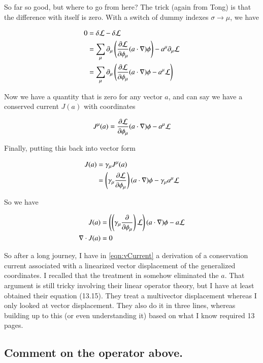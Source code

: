 \documentclass{article}
\begin{document}
So far so good, but where to go from here?  The trick (again from Tong) is that
the difference with itself is zero.  With a switch of dummy indexes $\sigma \rightarrow \mu$, we have

\begin{align*}
0 &=
\delta \mathcal{L} - \delta \mathcal{L}  \\
&= 
\sum_\mu
\partial_\mu
\left(
\frac{\partial {\mathcal{L}}}{\partial {\phi_\mu}}
(a \cdot \nabla) \phi 
\right) -
 a^\mu \partial_\mu \mathcal{L} 
\\
&= 
\sum_\mu
\partial_\mu
\left(
\frac{\partial {\mathcal{L}}}{\partial {\phi_\mu}}
(a \cdot \nabla) \phi 
- a^\mu \mathcal{L} 
\right)
\\
\end{align*}

Now we have a quantity that is zero for any vector $a$, and can say we have
a conserved current $J(a)$ with coordinates

\begin{align}
J^\mu(a)
=
\frac{\partial {\mathcal{L}}}{\partial {\phi_\mu}}
(a \cdot \nabla) \phi 
- a^\mu \mathcal{L} 
\end{align}

Finally, putting this back into vector form

\begin{align*}
J(a) &= \gamma_\mu J^\mu(a) \\
&=
\left( \gamma_\mu \frac{\partial {\mathcal{L}}}{\partial {\phi_\mu}} \right)
(a \cdot \nabla) \phi 
- \gamma_\mu a^\mu \mathcal{L}  \\
\end{align*}

So we have

\begin{align}\label{eqn:vCurrent}
J(a) &= 
\left( \left(\gamma_\mu \frac{\partial {}}{\partial {\phi_\mu}} \right) \mathcal{L} \right)
(a \cdot \nabla) \phi 
- a \mathcal{L}  \\
\nabla \cdot J(a) &= 0
\end{align}

So after a long journey, I have in
\ref{eqn:vCurrent}
a derivation of a conservation current associated
with 
a linearized vector displacement of the generalized coordinates.  I 
recalled that the treatment in
\cite{doran2003gap} somehow eliminated the $a$.  That argument is still tricky involving
their linear operator theory, but I have at least obtained their equation (13.15).
They treat a multivector displacement whereas I only looked at
vector displacement.  They also do it in three lines, whereas building up to this
(or even understanding it) based on what I know required 13 pages.

\subsection{ Comment on the operator above. }
\end{document}
